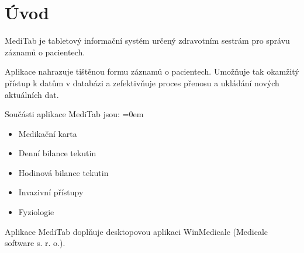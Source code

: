 \setlength{\parskip}{1em}

\chapter*{Úvod}

MediTab je tabletový informační systém určený zdravotním sestrám pro správu záznamů o pacientech.

Aplikace nahrazuje tištěnou formu záznamů o pacientech. Umožňuje tak okamžitý přístup k datům v databázi a zefektivňuje proces přenosu a ukládání nových aktuálních dat.

Součásti aplikace MediTab jsou:
\parskip=0em
\begin{itemize}
	\item Medikační karta
	\item Denní bilance tekutin
	\item Hodinová bilance tekutin
	\item Invazivní přístupy
	\item Fyziologie
\end{itemize}


Aplikace MediTab doplňuje desktopovou aplikaci WinMedicalc (Medicalc software s. r. o.).